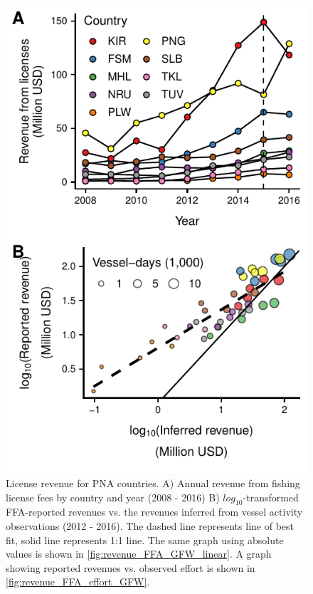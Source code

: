 \documentclass[12pt]{article}
\begin{document}
\begin{figure}[htbp]
\centering
\includegraphics{img/revenues.pdf}
\caption{\label{fig:revenues}
License revenue for PNA countries. A) Annual revenue from fishing license fees by country and year (2008 - 2016) B) $log_{10}$-transformed FFA-reported revenues vs. the revenues inferred from vessel activity observations (2012 - 2016). The dashed line represents line of best fit, solid line represents 1:1 line. The same graph using absolute values is shown in \ref{fig:revenue_FFA_GFW_linear}. A graph showing reported revenues vs. observed effort is shown in \ref{fig:revenue_FFA_effort_GFW}.}
\end{figure}
\end{document}

